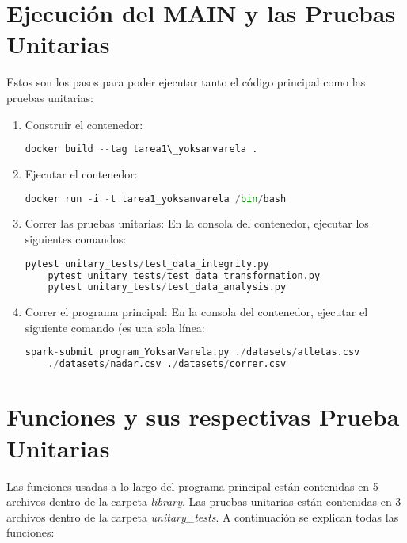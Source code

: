 \documentclass[a4paper]{article}
\begin{document}
\section{Ejecuci\'{o}n del MAIN y las Pruebas Unitarias}
Estos son los pasos para poder ejecutar tanto el c\'{o}digo principal como las pruebas unitarias:
\begin{enumerate}
    \item Construir el contenedor:
    \begin{lstlisting}[language=Python]
    docker build --tag tarea1\_yoksanvarela .
    \end{lstlisting}
        
    \item Ejecutar el contenedor:
    \begin{lstlisting}[language=Python]
    docker run -i -t tarea1_yoksanvarela /bin/bash
    \end{lstlisting}

    \item Correr las pruebas unitarias: En la consola del contenedor, ejecutar los siguientes comandos:
    \begin{lstlisting}[language=Python]
    pytest unitary_tests/test_data_integrity.py
    pytest unitary_tests/test_data_transformation.py
    pytest unitary_tests/test_data_analysis.py
    \end{lstlisting}

    \item Correr el programa principal: En la consola del contenedor, ejecutar el siguiente comando (es una sola l\'{i}nea:
    \begin{lstlisting}[language=Python]
    spark-submit program_YoksanVarela.py ./datasets/atletas.csv 
    ./datasets/nadar.csv ./datasets/correr.csv
    \end{lstlisting}

\end{enumerate}

\section{Funciones y sus respectivas Prueba Unitarias}
Las funciones usadas a lo largo del programa principal est\'{a}n contenidas en 5 archivos dentro de la carpeta \textit{library}. Las pruebas unitarias est\'{a}n contenidas en 3 archivos dentro de la carpeta \textit{unitary\_tests}. A continuaci\'{o}n se explican todas las funciones:
\end{document}
